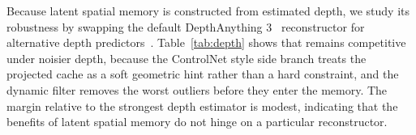 Because latent spatial memory is constructed from estimated depth, we study its robustness by swapping the default DepthAnything 3~\cite{lin2025depth} reconstructor for alternative depth predictors~\cite{keetha2025mapanything,piccinelli2024unidepth}. Table~\ref{tab:depth} shows that \method{} remains competitive under noisier depth, because the ControlNet style side branch treats the projected cache as a soft geometric hint rather than a hard constraint, and the dynamic filter removes the worst outliers before they enter the memory. The margin relative to the strongest depth estimator is modest, indicating that the benefits of latent spatial memory do not hinge on a particular reconstructor.
\begin{table}
    \centering
    \caption{\textbf{Sensitivity to the depth source.} We swap DepthAnything 3 for alternative depth predictors while keeping all other components of \method{} fixed.}
    \label{tab:depth}
\end{table}
